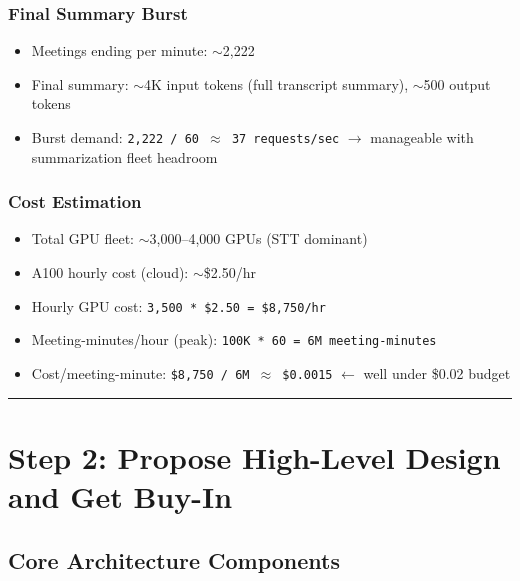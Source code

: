 \subsubsection*{Final Summary Burst}

\begin{itemize}
  \item Meetings ending per minute: $\sim$2,222
  \item Final summary: $\sim$4K input tokens (full transcript summary), $\sim$500 output tokens
  \item Burst demand: \texttt{2,222 / 60 $\approx$ 37 requests/sec} $\rightarrow$ manageable with summarization fleet headroom
\end{itemize}

\subsubsection*{Cost Estimation}

\begin{itemize}
  \item Total GPU fleet: $\sim$3,000--4,000 GPUs (STT dominant)
  \item A100 hourly cost (cloud): $\sim$\$2.50/hr
  \item Hourly GPU cost: \texttt{3,500 * \$2.50 = \$8,750/hr}
  \item Meeting-minutes/hour (peak): \texttt{100K * 60 = 6M meeting-minutes}
  \item Cost/meeting-minute: \texttt{\$8,750 / 6M $\approx$ \$0.0015} $\leftarrow$ well under \$0.02 budget
\end{itemize}

\bigskip\hrule\bigskip

\section*{Step 2: Propose High-Level Design and Get Buy-In}

\subsection*{Core Architecture Components}

